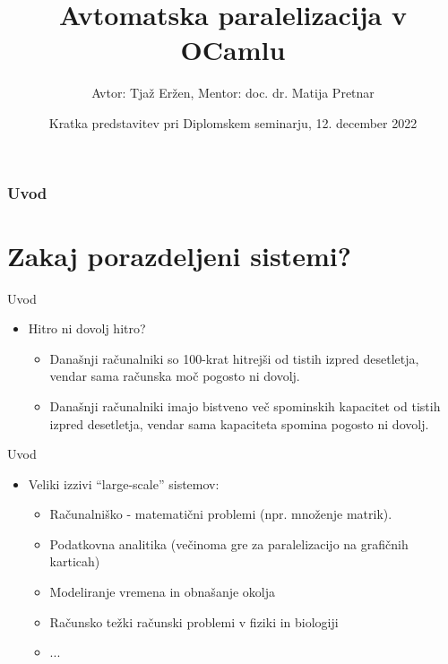 \documentclass{beamer}
\title[]
{Avtomatska paralelizacija v OCamlu}
\author[]
{Avtor: Tja\v z Er\v zen, Mentor: doc. dr. Matija Pretnar}
\date[12. december 2022] %
{Kratka predstavitev pri Diplomskem seminarju, 12. december 2022}
\begin{document}
\begin{frame}
  \titlepage
\end{frame}

\begin{frame}
  \frametitle{Uvod}
  \tableofcontents
\end{frame}

\section{Zakaj porazdeljeni sistemi?}

\begin{frame}{Uvod}
    \begin{itemize}
        \item Hitro ni dovolj hitro?
        \begin{itemize}
            \item Dana\v snji ra\v cunalniki so 100-krat hitrej\v si od tistih izpred desetletja, vendar sama ra\v cunska mo\v c pogosto ni dovolj.
            \item Dana\v snji ra\v cunalniki imajo bistveno ve\v c spominskih kapacitet od tistih izpred desetletja, vendar sama kapaciteta spomina pogosto ni dovolj.
        \end{itemize}
    \end{itemize}
\end{frame}

\begin{frame}{Uvod}
    \begin{itemize}
        \item Veliki izzivi ``large-scale'' sistemov:
        \begin{itemize}
            \item Ra\v cunalni\v sko - matemati\v cni problemi (npr. mno\v zenje matrik).
            \item Podatkovna analitika (ve\v cinoma gre za paralelizacijo na grafi\v cnih karticah)
            \item Modeliranje vremena in obna\v sanje okolja
            \item Ra\v cunsko te\v zki ra\v cunski problemi v fiziki in biologiji
            \item ...
        \end{itemize}
    \end{itemize}
\end{frame}
\end{document}
